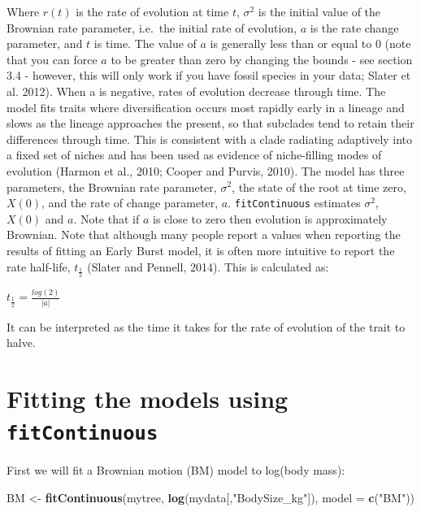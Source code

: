 \documentclass[]{book}
\newenvironment{Shaded}{\begin{snugshade}}{\end{snugshade}}
\newcommand{\KeywordTok}[1]{\textcolor[rgb]{0.13,0.29,0.53}{\textbf{{#1}}}}
\newcommand{\DataTypeTok}[1]{\textcolor[rgb]{0.13,0.29,0.53}{{#1}}}
\newcommand{\StringTok}[1]{\textcolor[rgb]{0.31,0.60,0.02}{{#1}}}
\newcommand{\NormalTok}[1]{{#1}}
\begin{document}
Where \(r(t)\) is the rate of evolution at time \(t\), \(\sigma^2\) is
the initial value of the Brownian rate parameter, i.e.~the initial rate
of evolution, \(a\) is the rate change parameter, and \(t\) is time. The
value of \(a\) is generally less than or equal to 0 (note that you can
force \(a\) to be greater than zero by changing the bounds - see section
3.4 - however, this will only work if you have fossil species in your
data; Slater et al. 2012). When a is negative, rates of evolution
decrease through time. The model fits traits where diversification
occurs most rapidly early in a lineage and slows as the lineage
approaches the present, so that subclades tend to retain their
differences through time. This is consistent with a clade radiating
adaptively into a fixed set of niches and has been used as evidence of
niche-filling modes of evolution (Harmon et al., 2010; Cooper and
Purvis, 2010). The model has three parameters, the Brownian rate
parameter, \(\sigma^2\), the state of the root at time zero, \(X(0)\),
and the rate of change parameter, \(a\). \texttt{fitContinuous}
estimates \(\sigma^2\), \(X(0)\) and \(a\). Note that if \(a\) is close
to zero then evolution is approximately Brownian. Note that although
many people report a values when reporting the results of fitting an
Early Burst model, it is often more intuitive to report the rate
half-life, \(t_{\frac{1}{2}}\) (Slater and Pennell, 2014). This is
calculated as:

\(t_{\frac{1}{2}} = \frac{log(2)}{|a|}\)

It can be interpreted as the time it takes for the rate of evolution of
the trait to halve.

\section{\texorpdfstring{Fitting the models using
\texttt{fitContinuous}}{Fitting the models using fitContinuous}}\label{fitting-the-models-using-fitcontinuous}

First we will fit a Brownian motion (BM) model to log(body mass):

\begin{Shaded}
\begin{Highlighting}[]
\NormalTok{BM <-}\StringTok{ }\KeywordTok{fitContinuous}\NormalTok{(mytree, }\KeywordTok{log}\NormalTok{(mydata[,}\StringTok{"BodySize_kg"}\NormalTok{]), }\DataTypeTok{model =} \KeywordTok{c}\NormalTok{(}\StringTok{"BM"}\NormalTok{))}
\end{Highlighting}
\end{Shaded}
\end{document}
